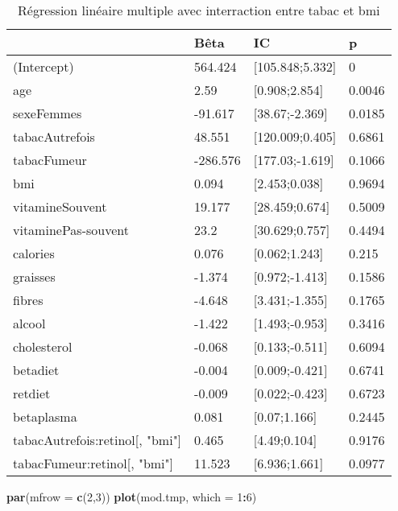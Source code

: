 \documentclass[]{article}
\newenvironment{Shaded}{\begin{snugshade}}{\end{snugshade}}
\newcommand{\KeywordTok}[1]{\textcolor[rgb]{0.13,0.29,0.53}{\textbf{#1}}}
\newcommand{\DataTypeTok}[1]{\textcolor[rgb]{0.13,0.29,0.53}{#1}}
\newcommand{\DecValTok}[1]{\textcolor[rgb]{0.00,0.00,0.81}{#1}}
\newcommand{\OperatorTok}[1]{\textcolor[rgb]{0.81,0.36,0.00}{\textbf{#1}}}
\newcommand{\NormalTok}[1]{#1}
\begin{document}
\begin{table}

\caption{\label{tab:unnamed-chunk-71}Régression linéaire multiple avec interraction entre tabac et bmi}
\centering
\begin{tabular}[t]{l|l|l|l}
\hline
  & Bêta & IC & p\\
\hline
\rowcolor[HTML]{BBD2E1}  (Intercept) & 564.424 & [105.848;5.332] & 0\\
\hline
age & 2.59 & [0.908;2.854] & 0.0046\\
\hline
\rowcolor[HTML]{BBD2E1}  sexeFemmes & -91.617 & [38.67;-2.369] & 0.0185\\
\hline
tabacAutrefois & 48.551 & [120.009;0.405] & 0.6861\\
\hline
\rowcolor[HTML]{BBD2E1}  tabacFumeur & -286.576 & [177.03;-1.619] & 0.1066\\
\hline
bmi & 0.094 & [2.453;0.038] & 0.9694\\
\hline
\rowcolor[HTML]{BBD2E1}  vitamineSouvent & 19.177 & [28.459;0.674] & 0.5009\\
\hline
vitaminePas-souvent & 23.2 & [30.629;0.757] & 0.4494\\
\hline
\rowcolor[HTML]{BBD2E1}  calories & 0.076 & [0.062;1.243] & 0.215\\
\hline
graisses & -1.374 & [0.972;-1.413] & 0.1586\\
\hline
\rowcolor[HTML]{BBD2E1}  fibres & -4.648 & [3.431;-1.355] & 0.1765\\
\hline
alcool & -1.422 & [1.493;-0.953] & 0.3416\\
\hline
\rowcolor[HTML]{BBD2E1}  cholesterol & -0.068 & [0.133;-0.511] & 0.6094\\
\hline
betadiet & -0.004 & [0.009;-0.421] & 0.6741\\
\hline
\rowcolor[HTML]{BBD2E1}  retdiet & -0.009 & [0.022;-0.423] & 0.6723\\
\hline
betaplasma & 0.081 & [0.07;1.166] & 0.2445\\
\hline
\rowcolor[HTML]{BBD2E1}  tabacAutrefois:retinol[, "bmi"] & 0.465 & [4.49;0.104] & 0.9176\\
\hline
tabacFumeur:retinol[, "bmi"] & 11.523 & [6.936;1.661] & 0.0977\\
\hline
\end{tabular}
\end{table}

\begin{Shaded}
\begin{Highlighting}[]
\KeywordTok{par}\NormalTok{(}\DataTypeTok{mfrow =} \KeywordTok{c}\NormalTok{(}\DecValTok{2}\NormalTok{,}\DecValTok{3}\NormalTok{))}
\KeywordTok{plot}\NormalTok{(mod.tmp, }\DataTypeTok{which =} \DecValTok{1}\OperatorTok{:}\DecValTok{6}\NormalTok{)}
\end{Highlighting}
\end{Shaded}
\end{document}
